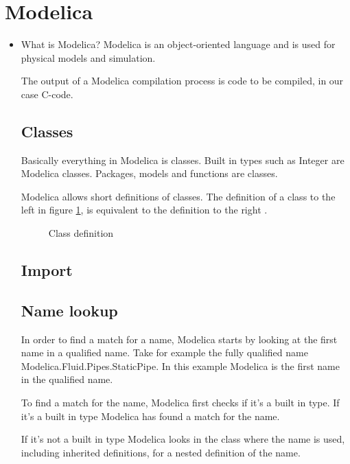 \documentclass{cslthse-msc}
\begin{document}
\section{Modelica}
\begin{itemize}
	\item What is Modelica?
Modelica is an object-oriented language and is used for physical models and simulation. 

The output of a Modelica compilation process is code to be compiled, in our case C-code.~\cite{aakesson2008development}

\subsection{Classes}
Basically everything in Modelica is classes. Built in types such as Integer are Modelica classes. Packages, models and functions are classes.

Modelica allows short definitions of classes. The definition of a class to the left in figure \ref{fig:classDefinition}, is equivalent to the definition to the right \cite{modelicamodelica}.

\begin{figure}[H]
    \centering
    \subfloat{{}}
    \qquad
    \subfloat{{}}
    \caption{Class definition}
    \label{fig:classDefinition}
\end{figure}

\subsection{Import}


\subsection{Name lookup}
In order to find a match for a name, Modelica starts by looking at the first name in a qualified name. Take for example the fully qualified name Modelica.Fluid.Pipes.StaticPipe. In this example Modelica is the first name in the qualified name.

To find a match for the name, Modelica first checks if it's a built in type. If it's a built in type Modelica has found a match for the name.

If it's not a built in type Modelica looks in the class where the name is used, including inherited definitions, for a nested definition of the name. 


\end{itemize}
\end{document}
